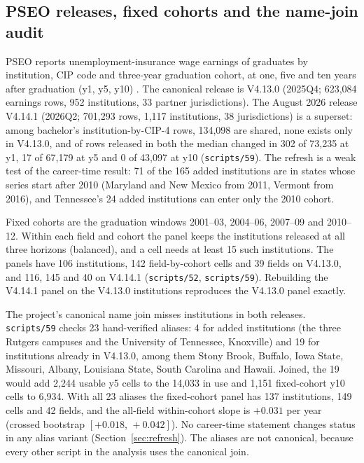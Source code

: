 \documentclass[11pt]{article}
\newcommand{\ci}[2]{$[#1,\allowbreak\,#2]$}
\newcommand{\scr}[1]{\texttt{scripts/#1}}
\begin{document}
\subsection{PSEO releases, fixed cohorts and the name-join audit}\label{sec:pseo}

PSEO reports unemployment-insurance wage earnings of graduates by institution, CIP code and three-year
graduation cohort, at one, five and ten years after graduation (y1, y5, y10) \citep{pseo}. The canonical
release is V4.13.0 (2025Q4; 623,084 earnings rows, 952 institutions, 33 partner jurisdictions). The August
2026 release V4.14.1 (2026Q2; 701,293 rows, 1,117 institutions, 38 jurisdictions) is a superset: among
bachelor's institution-by-CIP-4 rows, 134,098 are shared, none exists only in V4.13.0, and of rows released in
both the median changed in 302 of 73,235 at y1, 17 of 67,179 at y5 and 0 of 43,097 at y10 (\scr{59}). The
refresh is a weak test of the career-time result: 71 of the 165 added institutions are in states whose series
start after 2010 (Maryland and New Mexico from 2011, Vermont from 2016), and Tennessee's 24 added
institutions can enter only the 2010 cohort.

Fixed cohorts are the graduation windows 2001--03, 2004--06, 2007--09 and 2010--12. Within each field and
cohort the panel keeps the institutions released at all three horizons (balanced), and a cell needs at least
15 such institutions. The panels have 106 institutions, 142 field-by-cohort cells and 39 fields on V4.13.0,
and 116, 145 and 40 on V4.14.1 (\scr{52}, \scr{59}). Rebuilding the V4.14.1 panel on the V4.13.0
institutions reproduces the V4.13.0 panel exactly.

The project's canonical name join misses institutions in both releases. \scr{59} checks 23 hand-verified
aliases: 4 for added institutions (the three Rutgers campuses and the University of Tennessee, Knoxville) and
19 for institutions already in V4.13.0, among them Stony Brook, Buffalo, Iowa State, Missouri, Albany,
Louisiana State, South Carolina and Hawaii. Joined, the 19 would add 2,244 usable y5 cells to the 14,033 in use
and 1,151 fixed-cohort y10 cells to 6,934. With all 23 aliases the fixed-cohort panel has 137 institutions,
149 cells and 42 fields, and the all-field within-cohort slope is $+0.031$ per year (crossed bootstrap
\ci{+0.018}{+0.042}). No career-time statement changes status in any alias variant
(Section~\ref{sec:refresh}). The aliases are not canonical, because every other script in the analysis uses the canonical join.
\end{document}
